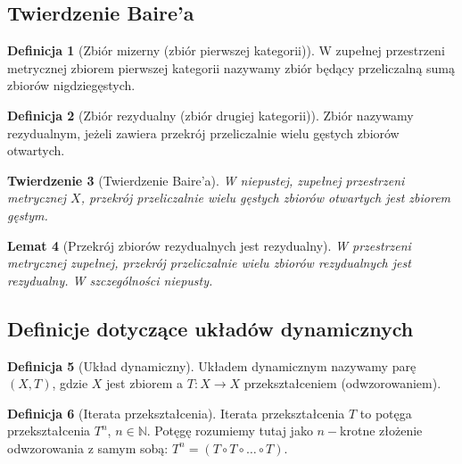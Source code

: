 \documentclass[licencjacka]{pwr_wmat_praca_dyplomowa}
\theoremstyle{plain}
\newtheorem{theorem}{Twierdzenie}
\numberwithin{theorem}{chapter}
\newtheorem{lemma}[theorem]{Lemat}
\theoremstyle{definition}
\numberwithin{theorem}{chapter}
\newtheorem{definition}[theorem]{Definicja}
\begin{document}
\subsection{Twierdzenie Baire'a}

\begin{definition}[Zbiór mizerny (zbiór pierwszej kategorii)]
W zupełnej przestrzeni metrycznej zbiorem pierwszej kategorii nazywamy zbiór będący przeliczalną sumą zbiorów nigdziegęstych.
\end{definition}

\begin{definition}[Zbiór rezydualny (zbiór drugiej kategorii)]
\label{definicja_zbioru_rezydualnego}
Zbiór nazywamy rezydualnym, jeżeli zawiera przekrój przeliczalnie wielu gęstych zbiorów otwartych.
\end{definition}



\begin{theorem}[Twierdzenie Baire'a]
\label{twierdzenie_bairea}
W niepustej, zupełnej przestrzeni metrycznej $X$, przekrój przeliczalnie wielu gęstych zbiorów otwartych jest zbiorem gęstym.
\end{theorem}


\begin{lemma}[Przekrój zbiorów rezydualnych jest rezydualny] \label{przekroj_rezydualnych_jest_rezydualny}
W przestrzeni metrycznej zupełnej, przekrój przeliczalnie wielu zbiorów rezydualnych jest rezydualny. W szczególności niepusty.
\end{lemma}



\subsection{Definicje dotyczące układów dynamicznych}

\begin{definition}[Układ dynamiczny]
Układem dynamicznym nazywamy parę $(X, T)$, gdzie $X$ jest zbiorem a $T:X \rightarrow X$ przekształceniem (odwzorowaniem).
\end{definition}

\begin{definition}[Iterata przekształcenia]
Iterata przekształcenia $T$ to potęga przekształcenia $T^n$, $n \in \mathbb{N}$. Potęgę rozumiemy tutaj jako $n-$krotne złożenie odwzorowania z samym sobą: $T^n = (T \circ T \circ \ldots \circ T).$
\end{definition}
\end{document}
